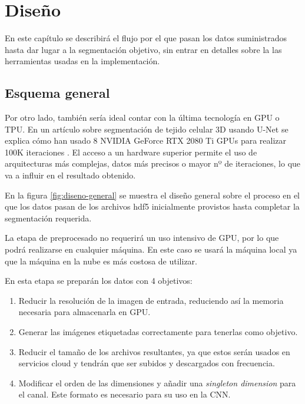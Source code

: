 \chapter{Diseño}\label{requisitos}

En este capítulo se describirá el flujo por el que pasan los datos suministrados hasta dar lugar a la segmentación objetivo, sin entrar en detalles sobre la las herramientas usadas en la implementación.

\section{Esquema general}\label{sec:diseno-general}

Por otro lado, también sería ideal contar con la última tecnología en GPU o TPU. En un artículo sobre segmentación de tejido celular 3D usando U-Net se explica cómo han usado 8 NVIDIA GeForce RTX 2080 Ti GPUs para realizar 100K iteraciones \cite{Wolny2020}. El acceso a un hardware superior permite el uso de arquitecturas más complejas, datos más precisos o mayor nº de iteraciones, lo que va a influir en el resultado obtenido.

\pagebreak {}

En la figura \ref{fig:diseno-general} se muestra el diseño general sobre el proceso en el que los datos pasan de los archivos hdf5 inicialmente provistos hasta completar la segmentación requerida.

La etapa de preprocesado no requerirá un uso intensivo de GPU, por lo que podrá realizarse en cualquier máquina. En este caso se usará la máquina local ya que la máquina en la nube es más costosa de utilizar.

En esta etapa se preparán los datos con 4 objetivos:
\begin{enumerate}
\item Reducir la resolución de la imagen de entrada, reduciendo así la memoria necesaria para almacenarla en GPU.
\item Generar las imágenes etiquetadas correctamente para tenerlas como objetivo.
\item Reducir el tamaño de los archivos resultantes, ya que estos serán usados en servicios cloud y tendrán que ser subidos y descargados con frecuencia.
\item Modificar el orden de las dimensiones y añadir una \textit{singleton dimension} para el canal. Este formato es necesario para su uso en la CNN.
\end{enumerate}

